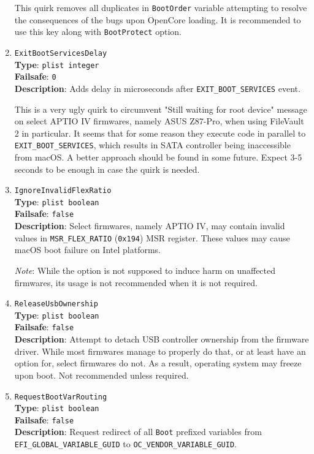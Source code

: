 \documentclass[]{article}
\begin{document}
\begin{enumerate}
  This quirk removes all duplicates in \texttt{BootOrder} variable attempting to resolve
  the consequences of the bugs upon OpenCore loading. It is recommended to use this key
  along with \texttt{BootProtect} option.

\item
  \texttt{ExitBootServicesDelay}\\
  \textbf{Type}: \texttt{plist\ integer}\\
  \textbf{Failsafe}: \texttt{0}\\
  \textbf{Description}: Adds delay in microseconds after \texttt{EXIT\_BOOT\_SERVICES}
  event.

  This is a very ugly quirk to circumvent "Still waiting for root device" message
  on select APTIO IV firmwares, namely ASUS Z87-Pro, when using FileVault 2 in particular.
  It seems that for some reason they execute code in parallel to \texttt{EXIT\_BOOT\_SERVICES},
  which results in SATA controller being inaccessible from macOS. A better approach should be
  found in some future. Expect 3-5 seconds to be enough in case the quirk is needed.

\item
  \texttt{IgnoreInvalidFlexRatio}\\
  \textbf{Type}: \texttt{plist\ boolean}\\
  \textbf{Failsafe}: \texttt{false}\\
  \textbf{Description}: Select firmwares, namely APTIO IV, may contain invalid values in
  \texttt{MSR\_FLEX\_RATIO} (\texttt{0x194}) MSR register. These values may cause
  macOS boot failure on Intel platforms.

  \emph{Note}: While the option is not supposed to induce harm on unaffected firmwares,
  its usage is not recommended when it is not required.

\item
  \texttt{ReleaseUsbOwnership}\\
  \textbf{Type}: \texttt{plist\ boolean}\\
  \textbf{Failsafe}: \texttt{false}\\
  \textbf{Description}: Attempt to detach USB controller ownership from
  the firmware driver. While most firmwares manage to properly do that,
  or at least have an option for, select firmwares do not. As a result,
  operating system may freeze upon boot. Not recommended unless required.

\item
  \texttt{RequestBootVarRouting}\\
  \textbf{Type}: \texttt{plist\ boolean}\\
  \textbf{Failsafe}: \texttt{false}\\
  \textbf{Description}: Request redirect of all \texttt{Boot} prefixed variables from
  \texttt{EFI\_GLOBAL\_VARIABLE\_GUID} to \newline \texttt{OC\_VENDOR\_VARIABLE\_GUID}.


\end{enumerate}
\end{document}
